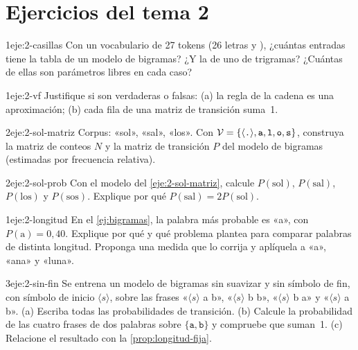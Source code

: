 \section*{Ejercicios del tema 2}

\begin{ejercicio}{1}{eje:2-casillas}
Con un vocabulario de 27 tokens (26 letras y \fin), ¿cuántas entradas tiene la tabla de un modelo de bigramas? ¿Y la de uno de trigramas? ¿Cuántas de ellas son parámetros libres en cada caso?
\end{ejercicio}

\begin{ejercicio}{1}{eje:2-vf}
Justifique si son verdaderas o falsas: (a) la regla de la cadena es una aproximación; (b) cada fila de una matriz de transición suma~1.
\end{ejercicio}

\begin{ejercicio}{2}{eje:2-sol-matriz}
Corpus: «sol», «sal», «los». Con $\mathcal{V}=\{\langle\texttt{.}\rangle,\texttt{a},\texttt{l},\texttt{o},\texttt{s}\}$, construya la matriz de conteos $N$ y la matriz de transición $P$ del modelo de bigramas (estimadas por frecuencia relativa).
\end{ejercicio}

\begin{ejercicio}{2}{eje:2-sol-prob}
Con el modelo del \cref{eje:2-sol-matriz}, calcule $P(\text{sol})$, $P(\text{sal})$, $P(\text{los})$ y $P(\text{sos})$. Explique por qué $P(\text{sal})=2P(\text{sol})$.
\end{ejercicio}

\begin{ejercicio}{1}{eje:2-longitud}
En el \cref{ej:bigramas}, la palabra más probable es «a», con $P(\text{a})=0{,}40$. Explique por qué y qué problema plantea para comparar palabras de distinta longitud. Proponga una medida que lo corrija y aplíquela a «a», «ana» y «luna».
\end{ejercicio}

\begin{ejercicio}{3}{eje:2-sin-fin}
Se entrena un modelo de bigramas sin suavizar y sin símbolo de fin, con símbolo de inicio $\langle s\rangle$, sobre las frases «$\langle s\rangle$ a b», «$\langle s\rangle$ b b», «$\langle s\rangle$ b a» y «$\langle s\rangle$ a b». (a) Escriba todas las probabilidades de transición. (b) Calcule la probabilidad de las cuatro frases de dos palabras sobre $\{\texttt{a},\texttt{b}\}$ y compruebe que suman~1. (c) Relacione el resultado con la \cref{prop:longitud-fija}.
\end{ejercicio}
